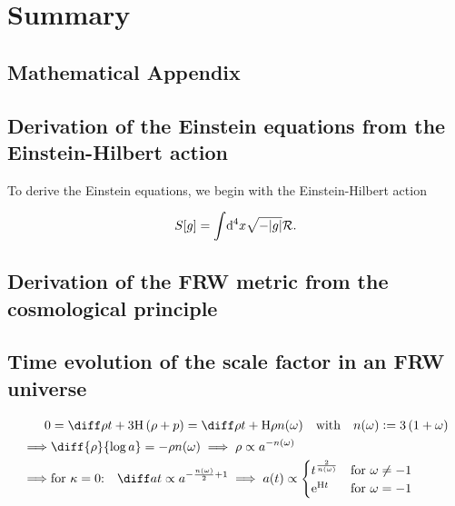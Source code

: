 \documentclass[parskip=half]{scrreprt}
\begin{document}



\chapter{Summary}


\begin{appendices}

\chapter{Mathematical Appendix}

\section{Derivation of the Einstein equations from the Einstein-Hilbert action}\label{app:deriv_einstein_eqns}

To derive the Einstein equations, we begin with the Einstein-Hilbert action

\begin{align}
	S[g] = \int \! \dif{^4x} \sqrt{-|g|} \Rscal \eqpunct{.}
\end{align}


\section{Derivation of the FRW metric from the cosmological principle}\label{app:deriv_frw}

\section{Time evolution of the scale factor in an FRW universe}\label{app:deriv_frw_a_evol}

\begin{align}
	0 &= \dt{\rho} + 3\Hcosm\del{\rho + p} = \dt{\rho} + \Hcosm\rho \nexp \quad \text{with} \quad \nexp \defeq 3\del{1 + \eosp} \\
	\implies &\diff{\rho}{\efold} = -\rho\nexp \implies \rho \propto a^{-\nexp} \\
	\implies &\text{for \(\spatcurv=0\):} \quad \dt{a} \propto a^{-\frac{\nexp}{2}+1} \implies a(t) \propto
	\begin{cases}
		t^{\frac{2}{\nexp}} &\text{for \(\eosp\neq-1\)} \\
		\eul^{\Hcosm t} &\text{for \(\eosp=-1\)}
	\end{cases}
\end{align}



\end{appendices}
\end{document}
